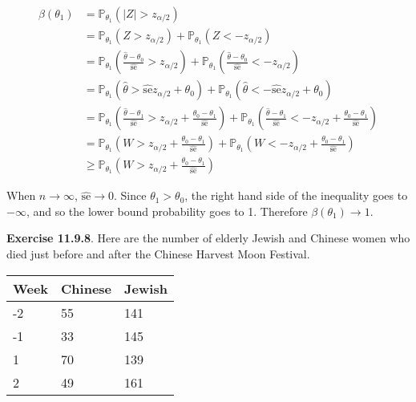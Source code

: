 \begin{align*}
\beta(\theta_{1}) &= \mathbb{P}_{\theta_{1}}(|Z| > z_{\alpha/2}) \\
&= \mathbb{P}_{\theta_{1}}(Z > z_{\alpha/2}) + \mathbb{P}_{\theta_{1}}(Z < - z_{\alpha/2})\\
&= \mathbb{P}_{\theta_{1}}\left(\frac{\hat{\theta} - \theta_{0}}{\hat{\text{se}}} > z_{\alpha/2}\right)
+ \mathbb{P}_{\theta_{1}}\left(\frac{\hat{\theta} - \theta_{0}}{\hat{\text{se}}} < -z_{\alpha/2}\right) \\
&= \mathbb{P}_{\theta_{1}}\left(\hat{\theta} > \hat{\text{se}} z_{\alpha/2} + \theta_{0} \right)
+ \mathbb{P}_{\theta_{1}}\left(\hat{\theta} < -\hat{\text{se}} z_{\alpha/2} + \theta_{0} \right) \\
&= \mathbb{P}_{\theta_{1}}\left(\frac{\hat{\theta} - \theta_{1}}{\hat{\text{se}}} >  z_{\alpha/2} + \frac{\theta_{0} - \theta_{1}}{\hat{\text{se}}} \right)
+ \mathbb{P}_{\theta_{1}}\left(\frac{\hat{\theta} - \theta_{1}}{\hat{\text{se}}} <  -z_{\alpha/2} + \frac{\theta_{0} - \theta_{1}}{\hat{\text{se}}} \right) \\
&= \mathbb{P}_{\theta_{1}}\left(W >  z_{\alpha/2} + \frac{\theta_{0} - \theta_{1}}{\hat{\text{se}}} \right)
+ \mathbb{P}_{\theta_{1}}\left(W <  -z_{\alpha/2} + \frac{\theta_{0} - \theta_{1}}{\hat{\text{se}}} \right) \\
& \geq \mathbb{P}_{\theta_{1}}\left(W >  z_{\alpha/2} + \frac{\theta_{0} - \theta_{1}}{\hat{\text{se}}} \right)
\end{align*}

When \(n \rightarrow \infty\), \(\hat{\text{se}} \rightarrow 0\). Since
\(\theta_{1} > \theta_{0}\), the right hand side of the inequality goes to
\(-\infty\), and so the lower bound probability goes to 1. Therefore
\(\beta(\theta_{1}) \rightarrow 1\).

\textbf{Exercise 11.9.8}. Here are the number of elderly Jewish and
Chinese women who died just before and after the Chinese Harvest Moon
Festival.

\begin{table}[H]
\centering
\begin{tabular}{@{}lll@{}}
\toprule
Week & Chinese & Jewish \\
\midrule
-2 & 55 & 141 \\
-1 & 33 & 145 \\
1 & 70 & 139 \\
2 & 49 & 161 \\
\bottomrule
\end{tabular}
\end{table}

